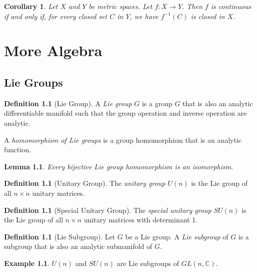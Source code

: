 \documentclass{book}
\newtheorem{cor}{Corollary}[prop]
\newtheorem{lm}[prop]{Lemma}
\theoremstyle{definition}
\newtheorem{df}[prop]{Definition}
\newtheorem{ex}[prop]{Example}
\begin{document}
\begin{cor}
Let $X$ and $Y$ be metric spaces. Let $f : X \rightarrow Y$. Then $f$ is continuous if and only if, for every closed set $C$ in $Y$, we have $f^{-1}(C)$ is closed in $X$.
\end{cor}

\part{More Algebra}

\chapter{Lie Groups}

\begin{df}[Lie Group]
A \emph{Lie group} $G$ is a group $G$ that is also an analytic differentiable manifold such that the group operation and inverse operation are analytic.

A \emph{homomorphism of Lie groups} is a group homomorphism that is an analytic function.
\end{df}

\begin{lm}
Every bijective Lie group homomorphism is an isomorphism.
\end{lm}


\begin{df}[Unitary Group]
The \emph{unitary group} $U(n)$ is the Lie group of all $n \times n$ unitary matrices.
\end{df}

\begin{df}[Special Unitary Group]
The \emph{special unitary group} $SU(n)$ is the Lie group of all $n \times n$ unitary matrices with determinant 1.
\end{df}

\begin{df}[Lie Subgroup]
Let $G$ be a Lie group. A \emph{Lie subgroup} of $G$ is a subgroup that is also an analytic submanifold of $G$.
\end{df}

\begin{ex}
$U(n)$ and $SU(n)$ are Lie subgroups of $GL(n, \mathbb{C})$.
\end{ex}
\end{document}
